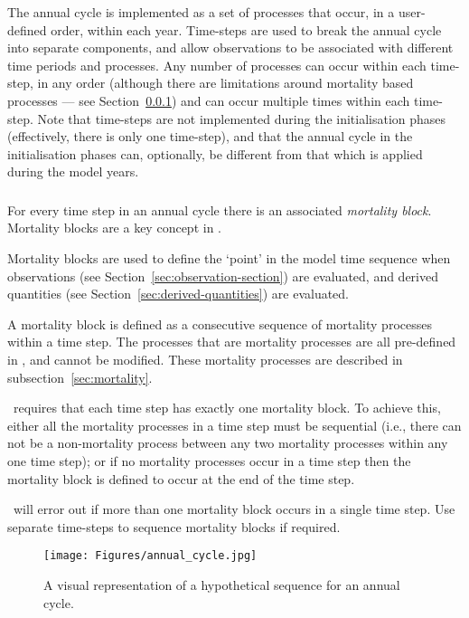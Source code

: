 The annual cycle is implemented as a set of processes that occur, in a user-defined order, within each year. Time-steps are used to break the annual cycle into separate components, and allow observations to be associated with different time periods and processes. Any number of processes can occur within each time-step, in any order (although there are limitations around mortality based processes --- see Section~\ref{sec:mortality_block}) and can occur multiple times within each time-step. Note that time-steps are not implemented during the initialisation phases (effectively, there is only one time-step), and that the annual cycle in the initialisation phases can, optionally, be different from that which is applied during the model years.

\subsubsection{}\label{sec:mortality_block}

For every time step in an annual cycle there is an associated \emph{mortality block}. Mortality blocks are a key concept in \CNAME.

Mortality blocks are used to define the `point' in the model time sequence when observations (see Section~\ref{sec:observation-section}) are evaluated, and derived quantities (see Section~\ref{sec:derived-quantities}) are evaluated.

A mortality block is defined as a consecutive sequence of mortality processes within a time step. The processes that are mortality processes are all pre-defined in \CNAME, and cannot be modified. These mortality processes are described in subsection~\ref{sec:mortality}. 

\CNAME\ requires that each time step has exactly one mortality block. To achieve this, either all the mortality processes in a time step must be sequential (i.e., there can not be a non-mortality process between any two mortality processes within any one time step); or if no mortality processes occur in a time step then the mortality block is defined to occur at the end of the time step. 

\CNAME\ will error out if more than one mortality block occurs in a single time step. Use separate time-steps to sequence mortality blocks if required.

\begin{figure}[H]
	\centering
	\texttt{[image: Figures/annual\_cycle.jpg]}
	\caption{A visual representation of a hypothetical sequence for an annual cycle.}\label{Fig:annual}
\end{figure}

